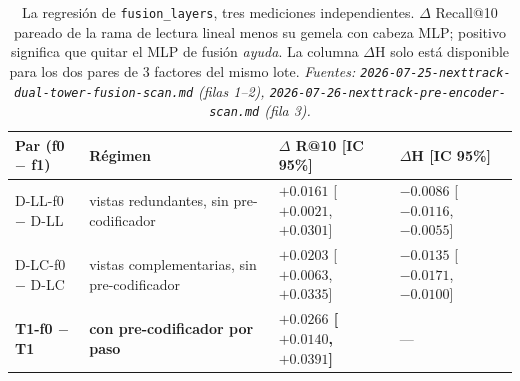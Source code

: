 \documentclass[11pt]{article}
\newcommand{\best}[1]{\textbf{#1}}
\begin{document}
\begin{table}[ht]
  \centering
  \caption{La regresión de \texttt{fusion\_layers}, tres mediciones
  independientes. $\Delta$ Recall@10 pareado de la rama de lectura lineal menos su
  gemela con cabeza MLP; positivo significa que quitar el MLP de fusión
  \emph{ayuda}. La columna $\Delta$H solo está disponible para los dos pares de 3
  factores del mismo lote. \emph{Fuentes:
  \texttt{2026-07-25-nexttrack-dual-tower-fusion-scan.md} (filas 1--2),
  \texttt{2026-07-26-nexttrack-pre-encoder-scan.md} (fila 3).}}
  \label{tab:fusion-depth}
  {\scriptsize\setlength{\tabcolsep}{4pt}\begin{tabular}{llll}
    \toprule
    Par (f0 $-$ f1) & Régimen & $\Delta$ R@10 [IC 95\%] & $\Delta$H [IC 95\%] \\
    \midrule
    D-LL-f0 $-$ D-LL & vistas redundantes, sin pre-codificador & $+0.0161$ [$+0.0021$, $+0.0301$] & $-0.0086$ [$-0.0116$, $-0.0055$] \\
    D-LC-f0 $-$ D-LC & vistas complementarias, sin pre-codificador & $+0.0203$ [$+0.0063$, $+0.0335$] & $-0.0135$ [$-0.0171$, $-0.0100$] \\
    \best{T1-f0 $-$ T1} & \best{con pre-codificador por paso} & \best{$+0.0266$ [$+0.0140$, $+0.0391$]} & --- \\
    \bottomrule
  \end{tabular}}
\end{table}
\end{document}
